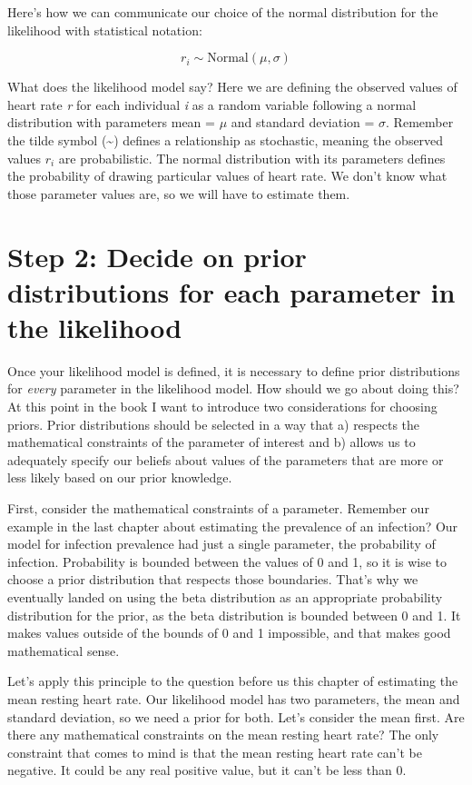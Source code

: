 \documentclass[
]{book}
\begin{document}
Here's how we can communicate our choice of the normal distribution for the likelihood with statistical notation:

\[
r_i \sim \mathrm{Normal}(\mu, \sigma)
\]

What does the likelihood model say? Here we are defining the observed values of heart rate \emph{r} for each individual \emph{i} as a random variable following a normal distribution with parameters mean = \(\mu\) and standard deviation = \(\sigma\). Remember the tilde symbol (\textasciitilde) defines a relationship as stochastic, meaning the observed values \(r_i\) are probabilistic. The normal distribution with its parameters defines the probability of drawing particular values of heart rate. We don't know what those parameter values are, so we will have to estimate them.

\section{Step 2: Decide on prior distributions for each parameter in the likelihood}\label{step-2-decide-on-prior-distributions-for-each-parameter-in-the-likelihood}

Once your likelihood model is defined, it is necessary to define prior distributions for \emph{every} parameter in the likelihood model. How should we go about doing this? At this point in the book I want to introduce two considerations for choosing priors. Prior distributions should be selected in a way that a) respects the mathematical constraints of the parameter of interest and b) allows us to adequately specify our beliefs about values of the parameters that are more or less likely based on our prior knowledge.

First, consider the mathematical constraints of a parameter. Remember our example in the last chapter about estimating the prevalence of an infection? Our model for infection prevalence had just a single parameter, the probability of infection. Probability is bounded between the values of 0 and 1, so it is wise to choose a prior distribution that respects those boundaries. That's why we eventually landed on using the beta distribution as an appropriate probability distribution for the prior, as the beta distribution is bounded between 0 and 1. It makes values outside of the bounds of 0 and 1 impossible, and that makes good mathematical sense.

Let's apply this principle to the question before us this chapter of estimating the mean resting heart rate. Our likelihood model has two parameters, the mean and standard deviation, so we need a prior for both. Let's consider the mean first. Are there any mathematical constraints on the mean resting heart rate? The only constraint that comes to mind is that the mean resting heart rate can't be negative. It could be any real positive value, but it can't be less than 0.
\end{document}
